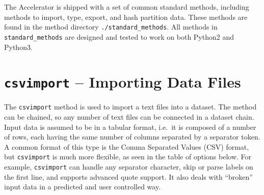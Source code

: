 
The Accelerator is shipped with a set of common standard methods,
including methods to import, type, export, and hash partition data.
These methods are found in the method
directory \texttt{./standard\_methods}.  All methods
in \texttt{standard\_methods} are designed and tested to work on both
Python2 and Python3.


\section{\texttt{csvimport} -- Importing Data Files}

The \texttt{csvimport} method is used to import a text files into a
dataset.  The method can be chained, so any number of text files can
be connected in a dataset chain.  Input data is assumed to be in a
tabular format, i.e.\ it is composed of a number of rows, each having
the same number of columns separated by a separator token.  A common
format of this type is the Comma Separated Values (CSV) format, but
\texttt{csvimport} is much more flexible, as seen in the table of
options below.  For example, \texttt{csvimport} can handle any
separator character, skip or parse labels on the first line, and
supports advanced quote support.  It also deals with ``broken'' input
data in a predicted and user controlled way.



